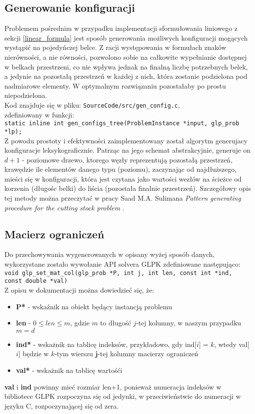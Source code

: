 \subsection{Generowanie konfiguracji}
Problemem pośrednim w przypadku implementacji sformułowania liniowego z sekcji \ref{linear_formula} jest sposób generowania możliwych konfiguracji mogących wystąpić na pojedyńczej belce.
Z racji występowania w formułach znaków nierówności, a nie równości, pozwolono sobie na całkowite wypełnianie dostępnej w belkach przestrzeni, co nie wpływa jednak na finalną liczbę potrzebnych belek, a jedynie na pozostałą przestrzeń w każdej z nich, która zostanie podzielona pod nadmiarowe elementy. W optymalnym rozwiązaniu pozostałaby po prostu niepodzielona.\\
Kod znajduje się w pliku: \verb|SourceCode/src/gen_config.c|,  \\ zdefiniowany w funkcji: \\ \verb|static inline int gen_configs_tree(ProblemInstance *input, glp_prob *lp);| \\
Z powodu prostoty i efektywności zaimplementowany został algorytm generujacy konfiguracje leksykograficznie. Patrząc na jego schemat abstrakcyjnie, generuje on $d + 1$ - poziomowe drzewo, ktorego węzły reprezentują pozostałą przestrzeń, krawędzie ile elementów danego typu (poziomu), zaczynając od najdłuższego, mieści się w konfiguracji, która jest czytana jako wartości wezłów na ścieżce od korzenia (długośc belki) do liścia (pozostała finalnie przestrzeń).
Szczegółowy opis tej metody można przeczytać w pracy Saad M.A. Sulimana \textit{Pattern generating procedure for the cutting stock problem} \cite{GEN_CONFIGS}. \\

\subsection{Macierz ograniczeń} \label{macierz_ograniczen}
Do przechowywania wygenerowanych w opisany wyżej sposób danych, wykorzystane zostało wywołanie API solvera GLPK zdefiniowane następująco: \\
\verb|void glp_set_mat_col(glp_prob *P, int j, int len, const int *ind, const double *val)| \\
Z opisu w dokumentacji \cite{GLPK_DOCS} można dowiedzieć się, że:
\begin{itemize}
	\item \textbf{P*} - wskaźnik na obiekt będący instancją problemu
	\item \textbf{len} - $0 \leq len \leq m$, gdzie $m$ to długość $j$-tej kolumny, w naszym przypadku $m = d$
	\item \textbf{ind*} - wskażnik na tablicę indeksów, przykładowo, gdy ind[$i$] = $k$, wtedy val[$i$] będzie w $k$-tym wierszu $\mathbf{j}$-tej kolumny macierzy ograniczeń
	\item \textbf{val*} - wskażnik na tablicę wartośći
\end{itemize}
\textbf{val} i \textbf{ind} powinny mieć rozmiar len+1, ponieważ numeracja indeksów w bibliotece GLPK rozpoczyna się od jedynki, w przeciwieństwie do numeracji w języku C, rozpoczynającej się od zera. \\

